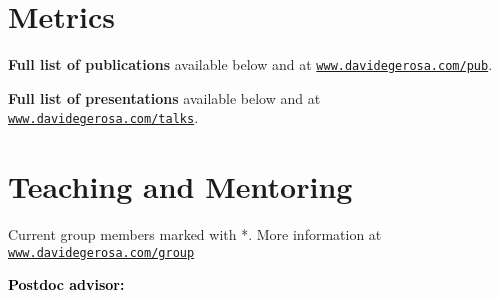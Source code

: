 

\section{Metrics}



\textbf{Full list of publications} available 
below and
at \href{http://www.davidegerosa.com/pub}{\texttt{www.davidegerosa.com/pub}}.

\vspace{0.2cm}



\textbf{Full list of presentations} available
below and
at \href{http://www.davidegerosa.com/talks}{\texttt{www.davidegerosa.com/talks}}.

\newpage{}
\section{Teaching and Mentoring}

Current group members marked with *.  More information at \href{http://www.davidegerosa.com/group}{\texttt{www.davidegerosa.com/group}}

\vspace{0.2cm}

%
\textbf{\textcolor{black}{Postdoc advisor:}}
\vspace{0.1cm}
\\
\vspace{-0.1cm}
%


